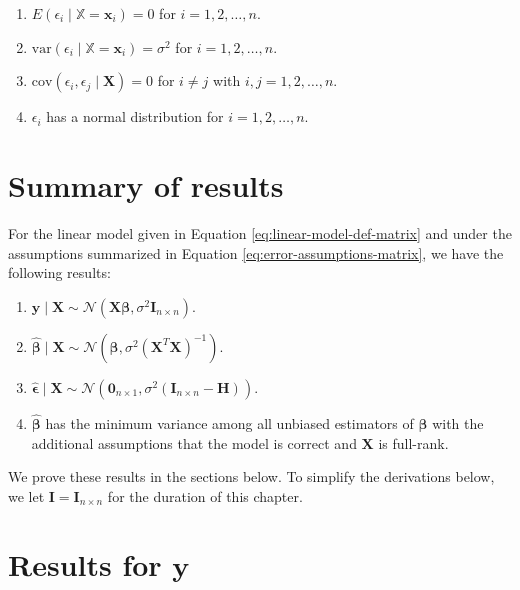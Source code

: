 \documentclass[
]{book}
\providecommand{\tightlist}{%
  \setlength{\itemsep}{0pt}\setlength{\parskip}{0pt}}
\theoremstyle{definition}
\theoremstyle{definition}
\theoremstyle{definition}
\theoremstyle{definition}
\theoremstyle{remark}
\begin{document}
\begin{enumerate}
\def\labelenumi{\arabic{enumi}.}
\tightlist
\item
  \(E(\epsilon_i \mid \mathbb{X}=\mathbf{x}_i)=0\) for \(i=1,2,\ldots,n\).
\item
  \(\mathrm{var}(\epsilon_i\mid \mathbb{X}=\mathbf{x}_i)=\sigma^2\) for \(i=1,2,\ldots,n\).
\item
  \(\mathrm{cov}(\epsilon_i,\epsilon_j\mid \mathbf{X})=0\) for \(i\neq j\) with \(i,j=1,2,\ldots,n\).
\item
  \(\epsilon_i\) has a normal distribution for \(i=1,2,\ldots,n\).
\end{enumerate}

\hypertarget{summary-of-results}{%
\section{Summary of results}\label{summary-of-results}}

For the linear model given in Equation \eqref{eq:linear-model-def-matrix} and under the assumptions summarized in Equation \eqref{eq:error-assumptions-matrix}, we have the following results:

\begin{enumerate}
\def\labelenumi{\arabic{enumi}.}
\tightlist
\item
  \(\mathbf{y}\mid \mathbf{X}\sim \mathcal{N}(\mathbf{X}\boldsymbol{\beta}, \sigma^2 \mathbf{I}_{n\times n})\).
\item
  \(\hat{\boldsymbol{\beta}}\mid \mathbf{X}\sim \mathcal{N}(\boldsymbol{\beta}, \sigma^2(\mathbf{X}^T\mathbf{X})^{-1})\).
\item
  \(\hat{\boldsymbol{\epsilon}}\mid \mathbf{X}\sim \mathcal{N}(\mathbf{0}_{n\times 1}, \sigma^2 (\mathbf{I}_{n\times n} - \mathbf{H}))\).
\item
  \(\hat{\boldsymbol{\beta}}\) has the minimum variance among all unbiased estimators of \(\boldsymbol{\beta}\) with the additional assumptions that the model is correct and \(\mathbf{X}\) is full-rank.
\end{enumerate}

We prove these results in the sections below. To simplify the derivations below, we let \(\mathbf{I}=\mathbf{I}_{n\times n}\) for the duration of this chapter.

\hypertarget{results-for-mathbfy}{%
\section{\texorpdfstring{Results for \(\mathbf{y}\)}{Results for \textbackslash mathbf\{y\}}}\label{results-for-mathbfy}}
\end{document}
